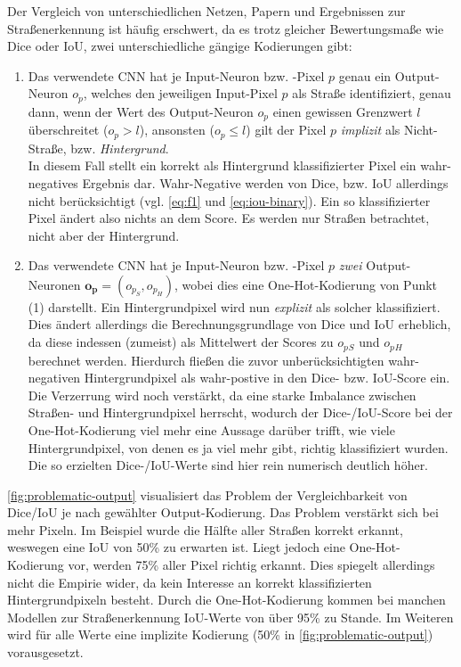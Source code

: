 Der Vergleich von unterschiedlichen Netzen, Papern und Ergebnissen zur Straßenerkennung ist häufig erschwert, 
da es trotz gleicher Bewertungsmaße wie Dice oder \ac{IoU}, zwei unterschiedliche gängige Kodierungen gibt:
\begin{enumerate}
	\item Das verwendete \ac{CNN} hat je Input-Neuron bzw. -Pixel $p$ genau ein Output-Neuron $o_p$, welches den jeweiligen Input-Pixel $p$
	als Straße identifiziert, genau dann, wenn der Wert des Output-Neuron $o_p$ einen gewissen Grenzwert $l$ überschreitet ($o_p > l$), 
	ansonsten ($o_p \leq l$) gilt der Pixel $p$ \textit{implizit} als Nicht-Straße, bzw. \textit{Hintergrund}. \\
	In diesem Fall stellt ein korrekt als Hintergrund klassifizierter Pixel ein wahr-negatives Ergebnis dar. 
	Wahr-Negative werden von Dice, bzw. \ac{IoU} allerdings nicht berücksichtigt (vgl. \autoref{eq:f1} und \ref{eq:iou-binary}).
	Ein so klassifizierter Pixel ändert also nichts an dem Score. Es werden nur Straßen betrachtet, nicht aber der Hintergrund.    
	\item Das verwendete \ac{CNN} hat je Input-Neuron bzw. -Pixel $p$ \textit{zwei} Output-Neuronen $\mathbf{o_p} = (o_{p_S}, o_{p_H})$, 
	wobei dies eine One-Hot-Kodierung von Punkt (1) darstellt. 
	Ein Hintergrundpixel wird nun \textit{explizit} als solcher klassifiziert. 
	Dies ändert allerdings die Berechnungsgrundlage von Dice und \ac{IoU} erheblich, da diese indessen (zumeist) als Mittelwert 
	der Scores zu $o_p{_S}$ und $o_p{_H}$ berechnet werden. Hierdurch fließen die zuvor unberücksichtigten wahr-negativen 
	Hintergrundpixel als wahr-postive in den Dice- bzw. \ac{IoU}-Score ein. Die Verzerrung wird noch verstärkt, 
	da eine starke Imbalance zwischen Straßen- und Hintergrundpixel herrscht, wodurch der Dice-/\ac{IoU}-Score bei 
	der One-Hot-Kodierung viel mehr eine Aussage darüber trifft, wie viele Hintergrundpixel, von denen es ja viel mehr gibt,
	richtig klassifiziert wurden. Die so erzielten Dice-/IoU-Werte sind hier rein numerisch deutlich höher. 
\end{enumerate}
\autoref{fig:problematic-output} visualisiert das Problem der Vergleichbarkeit von Dice/IoU je nach gewählter Output-Kodierung.
Das Problem verstärkt sich bei mehr Pixeln. Im Beispiel wurde die Hälfte aller Straßen korrekt erkannt, 
weswegen eine IoU von 50\% zu erwarten ist. Liegt jedoch eine One-Hot-Kodierung vor, werden 75\% aller Pixel richtig erkannt.
Dies spiegelt allerdings nicht die Empirie wider, da kein Interesse an korrekt klassifizierten Hintergrundpixeln besteht.
Durch die One-Hot-Kodierung kommen bei manchen Modellen zur Straßenerkennung IoU-Werte von über 95\% zu Stande.
Im Weiteren wird für alle Werte eine implizite Kodierung (50\% in \autoref{fig:problematic-output}) vorausgesetzt. 

